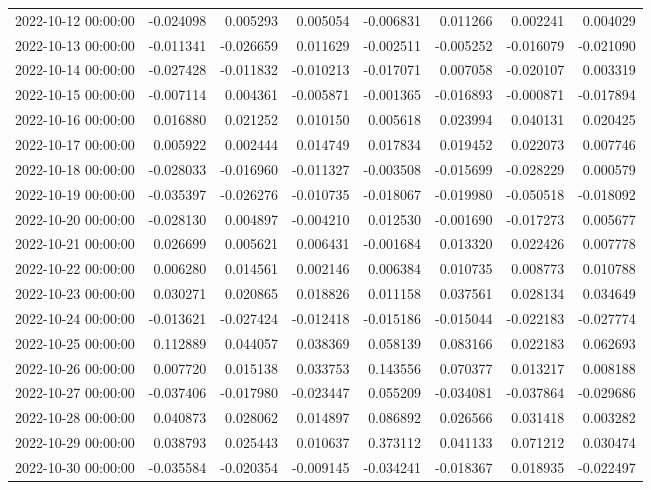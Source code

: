 \begin{tabular}{lrrrrrrr}
2022-10-12 00:00:00 & -0.024098 & 0.005293 & 0.005054 & -0.006831 & 0.011266 & 0.002241 & 0.004029 \\
2022-10-13 00:00:00 & -0.011341 & -0.026659 & 0.011629 & -0.002511 & -0.005252 & -0.016079 & -0.021090 \\
2022-10-14 00:00:00 & -0.027428 & -0.011832 & -0.010213 & -0.017071 & 0.007058 & -0.020107 & 0.003319 \\
2022-10-15 00:00:00 & -0.007114 & 0.004361 & -0.005871 & -0.001365 & -0.016893 & -0.000871 & -0.017894 \\
2022-10-16 00:00:00 & 0.016880 & 0.021252 & 0.010150 & 0.005618 & 0.023994 & 0.040131 & 0.020425 \\
2022-10-17 00:00:00 & 0.005922 & 0.002444 & 0.014749 & 0.017834 & 0.019452 & 0.022073 & 0.007746 \\
2022-10-18 00:00:00 & -0.028033 & -0.016960 & -0.011327 & -0.003508 & -0.015699 & -0.028229 & 0.000579 \\
2022-10-19 00:00:00 & -0.035397 & -0.026276 & -0.010735 & -0.018067 & -0.019980 & -0.050518 & -0.018092 \\
2022-10-20 00:00:00 & -0.028130 & 0.004897 & -0.004210 & 0.012530 & -0.001690 & -0.017273 & 0.005677 \\
2022-10-21 00:00:00 & 0.026699 & 0.005621 & 0.006431 & -0.001684 & 0.013320 & 0.022426 & 0.007778 \\
2022-10-22 00:00:00 & 0.006280 & 0.014561 & 0.002146 & 0.006384 & 0.010735 & 0.008773 & 0.010788 \\
2022-10-23 00:00:00 & 0.030271 & 0.020865 & 0.018826 & 0.011158 & 0.037561 & 0.028134 & 0.034649 \\
2022-10-24 00:00:00 & -0.013621 & -0.027424 & -0.012418 & -0.015186 & -0.015044 & -0.022183 & -0.027774 \\
2022-10-25 00:00:00 & 0.112889 & 0.044057 & 0.038369 & 0.058139 & 0.083166 & 0.022183 & 0.062693 \\
2022-10-26 00:00:00 & 0.007720 & 0.015138 & 0.033753 & 0.143556 & 0.070377 & 0.013217 & 0.008188 \\
2022-10-27 00:00:00 & -0.037406 & -0.017980 & -0.023447 & 0.055209 & -0.034081 & -0.037864 & -0.029686 \\
2022-10-28 00:00:00 & 0.040873 & 0.028062 & 0.014897 & 0.086892 & 0.026566 & 0.031418 & 0.003282 \\
2022-10-29 00:00:00 & 0.038793 & 0.025443 & 0.010637 & 0.373112 & 0.041133 & 0.071212 & 0.030474 \\
2022-10-30 00:00:00 & -0.035584 & -0.020354 & -0.009145 & -0.034241 & -0.018367 & 0.018935 & -0.022497 \\

\end{tabular}
